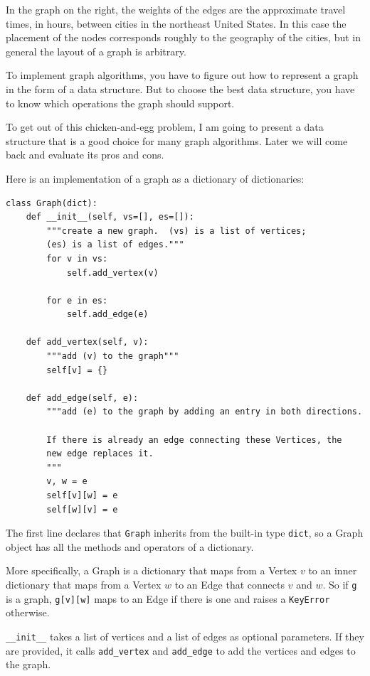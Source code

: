\documentclass[10pt]{book}
\begin{document}
In the graph on the right, the weights of the edges are the
approximate travel times, in hours, between cities in the northeast
United States.  In this case the placement of the nodes corresponds
roughly to the geography of the cities, but in general the layout
of a graph is arbitrary.

To implement graph algorithms, you have to figure
out how to represent a graph in the form of a data structure.
But to choose the best data structure, you have to know which
operations the graph should support.

To get out of this chicken-and-egg problem, I am going to present
a data structure that is a good choice for many graph algorithms.
Later we will come back and evaluate its pros and cons.

Here is an implementation of a graph as a dictionary of dictionaries:

\begin{verbatim}
class Graph(dict):
    def __init__(self, vs=[], es=[]):
        """create a new graph.  (vs) is a list of vertices;
        (es) is a list of edges."""
        for v in vs:
            self.add_vertex(v)
            
        for e in es:
            self.add_edge(e)

    def add_vertex(self, v):
        """add (v) to the graph"""
        self[v] = {}

    def add_edge(self, e):
        """add (e) to the graph by adding an entry in both directions.

        If there is already an edge connecting these Vertices, the
        new edge replaces it.
        """
        v, w = e
        self[v][w] = e
        self[w][v] = e
\end{verbatim}

The first line declares that {\tt Graph} inherits from the built-in
type {\tt dict}, so a Graph object has all the methods and operators
of a dictionary.

More specifically, a Graph is a dictionary that maps from
a Vertex $v$ to an inner dictionary that maps from a Vertex $w$
to an Edge that connects $v$ and $w$.  So if {\tt g} is a graph,
{\tt g[v][w]} maps to an Edge if there is one and raises
a {\tt KeyError} otherwise.

\verb"__init__" takes a list of vertices and a list of
edges as optional parameters.  If they are provided, it calls
\verb"add_vertex" and \verb"add_edge" to add the vertices and edges to
the graph.
\end{document}
